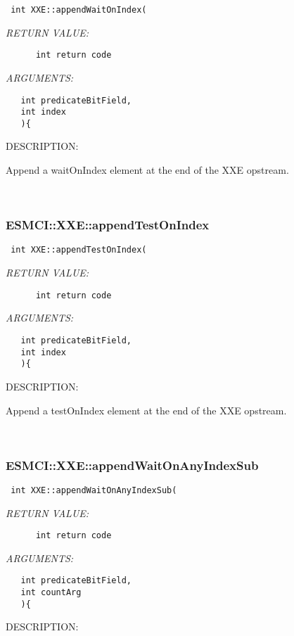   
\begin{verbatim} int XXE::appendWaitOnIndex(\end{verbatim}{\em RETURN VALUE:}
\begin{verbatim}      int return code\end{verbatim}{\em ARGUMENTS:}
\begin{verbatim}   int predicateBitField,
   int index
   ){\end{verbatim}
{\sf DESCRIPTION:\\ }


    Append a waitOnIndex element at the end of the XXE opstream. 
 
\mbox{}\hrulefill\
 
\subsubsection [ESMCI::XXE::appendTestOnIndex] {ESMCI::XXE::appendTestOnIndex}


  
\begin{verbatim} int XXE::appendTestOnIndex(\end{verbatim}{\em RETURN VALUE:}
\begin{verbatim}      int return code\end{verbatim}{\em ARGUMENTS:}
\begin{verbatim}   int predicateBitField,
   int index
   ){\end{verbatim}
{\sf DESCRIPTION:\\ }


    Append a testOnIndex element at the end of the XXE opstream. 
 
\mbox{}\hrulefill\
 
\subsubsection [ESMCI::XXE::appendWaitOnAnyIndexSub] {ESMCI::XXE::appendWaitOnAnyIndexSub}


  
\begin{verbatim} int XXE::appendWaitOnAnyIndexSub(\end{verbatim}{\em RETURN VALUE:}
\begin{verbatim}      int return code\end{verbatim}{\em ARGUMENTS:}
\begin{verbatim}   int predicateBitField,
   int countArg
   ){\end{verbatim}
{\sf DESCRIPTION:\\ }


